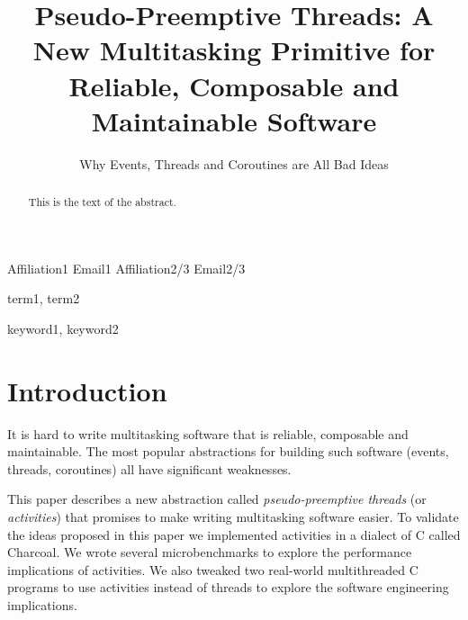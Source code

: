 \documentclass[10pt,preprint]{sigplanconf}
\begin{document}
\newcommand{\charcoal}{Charcoal}

\setlength{\pdfpageheight}{\paperheight}
\setlength{\pdfpagewidth}{\paperwidth}



\title{Pseudo-Preemptive Threads: A New Multitasking Primitive for Reliable, Composable and Maintainable Software}
\subtitle{Why Events, Threads and Coroutines are All Bad Ideas\footnotemark}

           {Affiliation1}
           {Email1}
           {Affiliation2/3}
           {Email2/3}

\maketitle

\begin{abstract}
This is the text of the abstract.
\end{abstract}


\terms
term1, term2

\keywords
keyword1, keyword2


\section{Introduction}

It is hard to write multitasking software that is reliable, composable and maintainable.
The most popular abstractions for building such software (events, threads, coroutines) all have significant weaknesses.

This paper describes a new abstraction called \emph{pseudo-preemptive threads} (or \emph{activities}) that promises to make writing multitasking software easier.
To validate the ideas proposed in this paper we implemented activities in a dialect of C called \charcoal{}.
We wrote several microbenchmarks to explore the performance implications of activities.
We also tweaked two real-world multithreaded C programs to use activities instead of threads to explore the software engineering implications.
\end{document}
